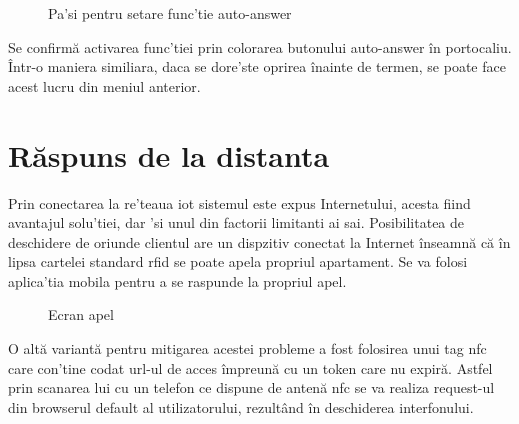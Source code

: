 \begin{figure}[H]
\begin{center}
  \hfil
  \caption{Pa'si pentru setare func'tie auto-answer}
  \label{fig:autoanswer}
\end{center}
\end{figure}

Se confirmă activarea func'tiei prin colorarea butonului auto-answer în portocaliu. Într-o maniera similiara, daca se dore'ste oprirea înainte de termen, se poate face acest lucru din meniul anterior.

\section{Răspuns de la distanta}

Prin conectarea la re'teaua \acrshort{iot} sistemul este expus Internetului, acesta fiind avantajul solu'tiei, dar 'si unul din factorii limitanti ai sai. Posibilitatea de deschidere de oriunde clientul are un dispzitiv conectat la Internet înseamnă că în lipsa cartelei standard \acrfull{rfid} se poate apela propriul apartament. Se va folosi aplica'tia mobila pentru a se raspunde la propriul apel.

\begin{figure}[H]
\begin{center}
  \hfil
  \caption{Ecran apel}
  \label{fig:ringing}
\end{center}
\end{figure}

O altă variantă pentru mitigarea acestei probleme a fost folosirea unui tag \acrfull{nfc} care con'tine codat url-ul de acces împreună cu un token care nu expiră. Astfel prin scanarea lui cu un telefon ce dispune de antenă \acrshort{nfc} se va realiza request-ul din browserul default al utilizatorului, rezultând în deschiderea interfonului.